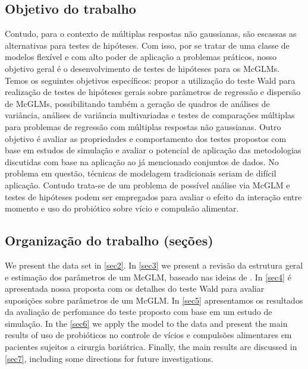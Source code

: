 \documentclass[AMA,STIX1COL]{WileyNJD-v2}
\begin{document}
\subsection{Objetivo do trabalho}

Contudo, para o contexto de múltiplas respostas não gaussianas, são escassas as alternativas para testes de hipóteses. Com isso, por se tratar de uma classe de modelos flexível e com alto poder de aplicação a problemas práticos, nosso objetivo geral é o desenvolvimento de testes de hipóteses para os McGLMs. Temos os seguintes objetivos específicos: propor a utilização do teste Wald para realização de testes de hipóteses gerais sobre parâmetros de regressão e dispersão de McGLMs, possibilitando também a geração de quadros de análises de variância, análises de variância multivariadas e testes de comparações múltiplas para problemas de regressão com múltiplas respostas não gaussianas. Outro objetivo é avaliar as propriedades e comportamento dos testes propostos com base em estudos de simulação e avaliar o potencial de aplicação das metodologias discutidas com base na aplicação ao já mencionado conjuntos de dados. No problema em questão, técnicas de modelagem tradicionais seriam de difícil aplicação. Contudo trata-se de um problema de possível análise via McGLM e testes de hipóteses podem ser empregados para avaliar o efeito da interação entre momento e uso do probiótico sobre vício e compulsão alimentar.

\subsection{Organização do trabalho (seções)}

We present the data set in \autoref{sec2}. In \autoref{sec3} we present a revisão da estrutura geral e estimação dos parâmetros de um McGLM, baseado nas ideias de \cite{Bonat16}. In \autoref{sec4} é apresentada nossa proposta com os detalhes do teste Wald para avaliar suposições sobre parâmetros de um McGLM. In \autoref{sec5} apresentamos os resultados da avaliação de perfomance do teste proposto com base em um estudo de simulação. In the \autoref{sec6} we apply the model to the data and present the main results of uso de probióticos no controle de vícios e compulsões alimentares em pacientes sujeitos a cirurgia bariátrica. Finally, the main results are discussed in \autoref{sec7}, including some directions for future investigations.

\end{document}
